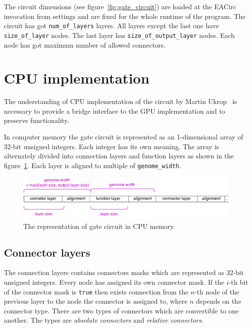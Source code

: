 \documentclass[12pt,oneside]{fithesis2}
\begin{document}
The circuit dimensions (see figure~\ref{fig:gate_circuit}) are loaded at the EACirc invocation from settings and are fixed for the whole runtime of the program. The circuit has got \texttt{num\_of\_layers} layers. All layers except the last one have \texttt{size\_of\_layer} nodes. The last layer has \texttt{size\_of\_output\_layer} nodes. Each node has got maximum number of allowed connectors.


\section{CPU implementation}
\label{cpu_implementation}

The understanding of CPU implementation of the circuit by Martin Ukrop~\cite{ukrop_thesis} is necessary to provide a bridge interface to the GPU implementation and to preserve functionality.

In computer memory the gate circuit is represented as an 1-dimensional array of 32-bit unsigned integers. Each integer has its own meaning. The array is alternately divided into connection layers and function layers as shown in the figure~\ref{fig:circuit_cpu_array}. Each layer is aligned to multiple of \texttt{genome\_width}.

\begin{figure}[h]
	\centering
	\includegraphics[width=\textwidth]{figures/cpu_genome.pdf}
	\caption{The representation of gate circuit in CPU memory.}
	\label{fig:circuit_cpu_array}
\end{figure}

\subsection{Connector layers}

The connection layers contains connectors masks which are represented as 32-bit unsigned integers. Every node has assigned its own connector mask. If the $i$-th bit of the connector mask is \texttt{true} then exists connection from the $n$-th node of the previous layer to the node the connector is assigned to, where $n$ depends on the connector type. There are two types of connectors which are convertible to one another. The types are \emph{absolute connectors} and \emph{relative connectors}.
\end{document}
